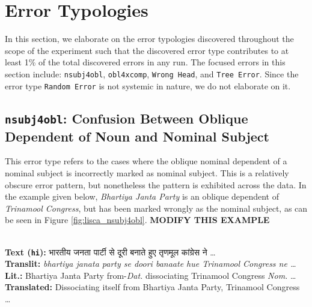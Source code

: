 \section{Error Typologies}
\label{typologies:lisca}

In this section, we elaborate on the error typologies discovered throughout the scope of the experiment such that the discovered error type contributes to at least 1\% of the total discovered errors in any run. The focused errors in this section include: \texttt{nsubj4obl}, \texttt{obl4xcomp}, \texttt{Wrong Head}, and \texttt{Tree Error}. Since the error type \texttt{Random Error} is not systemic in nature, we do not elaborate on it.

\subsection[Confusion Between Oblique Dependent of Noun and Nominal Subject: \texttt{nsubj4obl}]{\texttt{nsubj4obl}: Confusion Between Oblique Dependent of Noun and Nominal Subject}

This error type refers to the cases where the oblique nominal dependent of a nominal subject is incorrectly marked as nominal subject. This is a relatively obscure error pattern, but nonetheless the pattern is exhibited across the data. In the example given below, \textit{Bhartiya Janta Party} is an oblique dependent of \textit{Trinamool Congress}, but has been marked wrongly as the nominal subject, as can be seen in Figure \ref{fig:lisca_nsubj4obl}. \textbf{MODIFY THIS EXAMPLE}

\begin{example}
\label{examp:lisca_hi}
\textbf{ }\\
\textbf{Text (\texttt{hi}):} \texthindi{भारतीय जनता पार्टी से दूरी बनाते हुए तृणमूल कांग्रेस ने …}\\
\textbf{Translit:} \textit{bhartiya janata party se doori banaate hue Trinamool Congress ne …}\\
\textbf{Lit.:} Bhartiya Janta Party from-\textit{Dat.} dissociating Trinamool Congress \textit{Nom.} …\\
\textbf{Translated:} Dissociating itself from Bhartiya Janta Party, Trinamool Congress …
\end{example}

